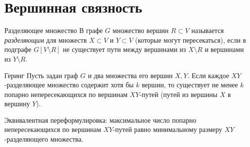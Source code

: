 
\section{Вершинная связность}


\begin{Definition}{Разделяющее множество}{}
	В графе $G$ множество вершин $R \subset V$ называется
	\emph{разделяющим} для множеств $X \subset V$ и $Y \subset V$
	(которые могут пересекаться), если в подграфе $G[V \setminus R]$
	не существует пути между вершинами из $X \setminus R$
	и вершинами из $Y \setminus R$.
\end{Definition}

\begin{Theorem}{Геринг}{}
	Пусть задан граф $G$ и два множества его вершин $X, Y$.
	Если каждое $XY$-разделяющее множество содержит хотя бы $k$ вершин,
	то существует не менее $k$ попарно непересекающихся по вершинам
	$XY$-путей (путей из вершины $X$ в вершину $Y$).
\end{Theorem}

\begin{Statement}{}{}
	Эквивалентная переформулировка: максимальное число попарно
	непересекающихся по вершинам $XY$-путей равно минимальному
	размеру $XY$-разделяющего множества.
\end{Statement}

